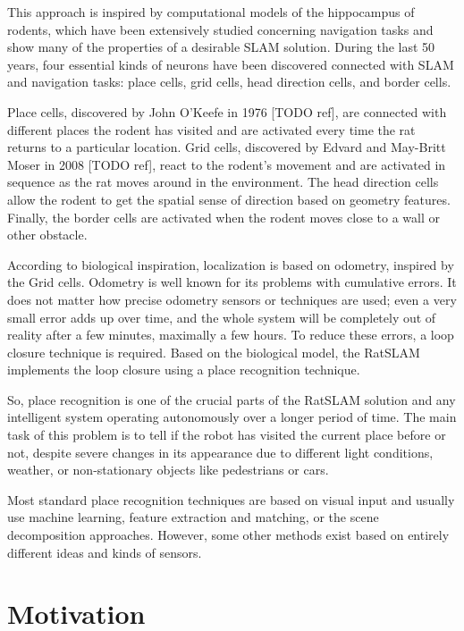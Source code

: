 This approach is inspired by computational models of the hippocampus of rodents, which have been extensively studied concerning navigation tasks and show many of the properties of a desirable SLAM solution. During the last 50 years, four essential kinds of neurons have been discovered connected with SLAM and navigation tasks: place cells, grid cells, head direction cells, and border cells.\par
Place cells, discovered by John O'Keefe in 1976 [TODO ref], are connected with different places the rodent has visited and are activated every time the rat returns to a particular location. Grid cells, discovered by Edvard and May-Britt Moser in 2008 [TODO ref], react to the rodent's movement and are activated in sequence as the rat moves around in the environment. The head direction cells allow the rodent to get the spatial sense of direction based on geometry features. Finally, the border cells are activated when the rodent moves close to a wall or other obstacle.\par
According to biological inspiration, localization is based on odometry, inspired by the Grid cells. Odometry is well known for its problems with cumulative errors. It does not matter how precise odometry sensors or techniques are used; even a very small error adds up over time, and the whole system will be completely out of reality after a few minutes, maximally a few hours. To reduce these errors, a loop closure technique is required. Based on the biological model, the RatSLAM implements the loop closure using a place recognition technique.\par
So, place recognition is one of the crucial parts of the RatSLAM solution and any intelligent system operating autonomously over a longer period of time. The main task of this problem is to tell if the robot has visited the current place before or not, despite severe changes in its appearance due to different light conditions, weather, or non-stationary objects like pedestrians or cars.\par
Most standard place recognition techniques are based on visual input and usually use machine learning, feature extraction and matching, or the scene decomposition approaches. However, some other methods exist based on entirely different ideas and kinds of sensors.


\section{Motivation}\label{section:motivation}

